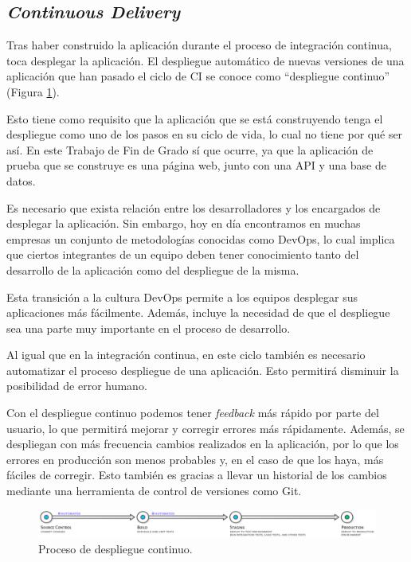 \subsection*{\textit{Continuous Delivery}}
\label{subsec:CD}

Tras haber construido la aplicación durante el proceso de integración continua, toca desplegar la aplicación. El despliegue automático de nuevas versiones de una aplicación que han pasado el ciclo de CI se conoce como ``despliegue continuo'' (Figura \ref{fig:cd}).

Esto tiene como requisito que la aplicación que se está construyendo tenga el despliegue como uno de los pasos en su ciclo de vida, lo cual no tiene por qué ser así. En este Trabajo de Fin de Grado sí que ocurre, ya que la aplicación de prueba que se construye es una página web, junto con una API y una base de datos.

Es necesario que exista relación entre los desarrolladores y los encargados de desplegar la aplicación. Sin embargo, hoy en día encontramos en muchas empresas un conjunto de metodologías conocidas como DevOps\cite{devops}, lo cual implica que ciertos integrantes de un equipo deben tener conocimiento tanto del desarrollo de la aplicación como del despliegue de la misma.

Esta transición a la cultura DevOps permite a los equipos desplegar sus aplicaciones más fácilmente. Además, incluye la necesidad de que el despliegue sea una parte muy importante en el proceso de desarrollo.

Al igual que en la integración continua, en este ciclo también es necesario automatizar el proceso despliegue de una aplicación. Esto permitirá disminuir la posibilidad de error humano.

Con el despliegue continuo podemos tener \textit{feedback} más rápido por parte del usuario, lo que permitirá mejorar y corregir errores más rápidamente. Además, se despliegan con más frecuencia cambios realizados en la aplicación, por lo que los errores en producción son menos probables y, en el caso de que los haya, más fáciles de corregir. Esto también es gracias a llevar un historial de los cambios mediante una herramienta de control de versiones como Git.

\begin{figure}
  \centerline{\includegraphics[width=17cm]{figuras/cd}}
  \caption{Proceso de despliegue continuo\cite{img:cd}.}
  \label{fig:cd}
\end{figure}

